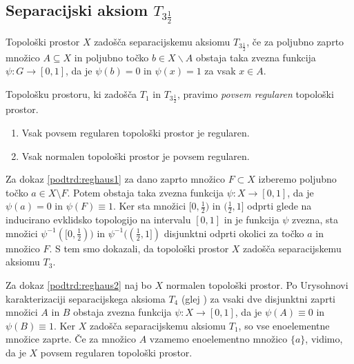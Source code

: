 \documentclass[mat1]{fmfdelo}
\begin{document}
\subsection{Separacijski aksiom $T_{3 \frac{1}{2}}$}

\begin{definicija}
	Topološki prostor $X$ zadošča separacijskemu aksiomu $T_{3 \frac{1}{2}}$, če za poljubno zaprto množico $A \subseteq X$ in poljubno točko $b \in X\backslash A$ obstaja taka zvezna funkcija $\psi\colon G \to [0, 1]$, da je $\psi (b) = 0$ in $\psi (x) = 1$ za vsak $x \in A$.
\end{definicija}

\begin{opomba}
	Topološku prostoru, ki zadošča $T_1$ in $T_{3 \frac{1}{2}}$, pravimo \emph{povsem regularen} topološki prostor.
\end{opomba}


\begin{trditev}\label{pos:reghaus}
\begin{enumerate}
\item Vsak povsem regularen topološki prostor je regularen.\label{podtrd:reghaus1}
\item Vsak normalen topološki prostor je povsem regularen.\label{podtrd:reghaus2}
\end{enumerate}
\end{trditev}

\begin{dokaz}
Za dokaz \ref{podtrd:reghaus1} za dano zaprto množico $F \subset X$ izberemo poljubno točko $a \in X \setminus F$. Potem obstaja taka zvezna funkcija $\psi\colon X \to [0, 1]$, da je $\psi(a) = 0$ in $\psi(F) \equiv 1$.
Ker sta množici $[0, \frac{1}{2})$ in $(\frac{1}{2}, 1]$ odprti glede na inducirano evklidsko topologijo na intervalu $[0, 1]$ in je funkcija $\psi$ zvezna, sta množici $\psi^{-1}([0, \frac{1}{2}))$ in $\psi^{-1}((\frac{1}{2}, 1])$ disjunktni odprti okolici za točko $a$ in množico $F$.
S tem smo dokazali, da topološki prostor $X$ zadošča separacijskemu aksiomu $T_3$.

Za dokaz \ref{podtrd:reghaus2} naj bo $X$ normalen topološki prostor. Po Urysohnovi karakterizaciji separacijskega aksioma $T_4$ (glej \cite{bib:top}) za vsaki dve disjunktni zaprti množici $A$ in $B$ obstaja zvezna funkcija $\psi\colon X \to [0, 1]$, da je $\psi(A) \equiv 0 $ in $\psi(B) \equiv 1$. Ker $X$ zadošča separacijskemu aksiomu $T_1$, so vse enoelementne množice zaprte. Če za množico $A$ vzamemo enoelementno množico $\lbrace a \rbrace$, vidimo, da je $X$ povsem regularen topološki prostor.
\end{dokaz}
\end{document}
